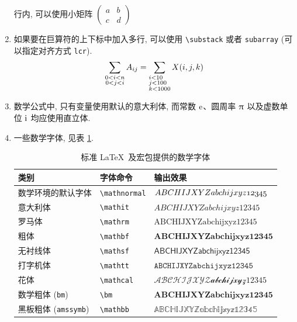 \documentclass[UTF8,no-math]{ctexart}
\numberwithin{enumi}{section}
\begin{document}
\begin{enumerate}
        行内, 可以使用小矩阵 $\left(\begin{smallmatrix}
        a&b\\c&d
        \end{smallmatrix}\right) $
        \item 如果要在巨算符的上下标中加入多行, 可以使用 \verb|\substack| 或者 \verb|subarray| (可以指定对齐方式 \verb|lcr|).
        \begin{equation}
            \sum_{\substack{0<i<n \\ 0<j<i}} A_{ij}=\sum_{\begin{subarray}{l}
                i<10 \\ j<100 \\ k<1000
                \end{subarray}} X(i,j,k)
        \end{equation}
        \item 数学公式中, 只有变量使用默认的意大利体, 而常数 $\mathrm{e}$、圆周率 $\uppi$ 以及虚数单位 $\mathrm{i}$ 均应使用直立体.
        \item 一些数学字体, 见表 \ref{tab:mathfonts}. 
        \begin{table}[htb]
            \centering
            \caption{标准 \LaTeX\ 及宏包提供的数学字体}
            \label{tab:mathfonts}
            \begin{tabular}{lll}
                \toprule
                类别 & 字体命令 & 输出效果 \\
                \midrule
                数学环境的默认字体 & \verb|\mathnormal| & $\mathnormal{ABCHIJXYZabchijxyz12345}$ \\
                意大利体 & \verb|\mathit| & $\mathit{ABCHIJXYZabchijxyz12345}$ \\
                罗马体 & \verb|\mathrm| & $\mathrm{ABCHIJXYZabchijxyz12345}$ \\
                粗体 & \verb|\mathbf| & $\mathbf{ABCHIJXYZabchijxyz12345}$ \\
                无衬线体 & \verb|\mathsf| & $\mathsf{ABCHIJXYZabchijxyz12345}$ \\
                打字机体 & \verb|\mathtt| & $\mathtt{ABCHIJXYZabchijxyz12345}$ \\
                花体\footnotemark & \verb|\mathcal| & $\mathcal{ABCHIJXYZabchijxyz12345}$\\
                数学粗体 (\verb|bm|) & \verb|\bm| & $\bm{ABCHIJXYZabchijxyz12345}$ \\
                黑板粗体 (\verb|amssymb|) & \verb|\mathbb| & $\mathbb{ABCHIJXYZabchijxyz12345}$ \\

\end{tabular}
\end{table}
\end{enumerate}
\end{document}
